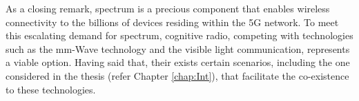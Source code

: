 As a closing remark, spectrum is a precious component that enables wireless connectivity to the billions of devices residing within the 5G network. To meet this escalating demand for spectrum, cognitive radio, competing with technologies such as the mm-Wave technology and the visible light communication, represents a viable option. Having said that, their exists certain scenarios, including the one considered in the thesis (refer Chapter \ref{chap:Int}), that facilitate the co-existence to these technologies. 







